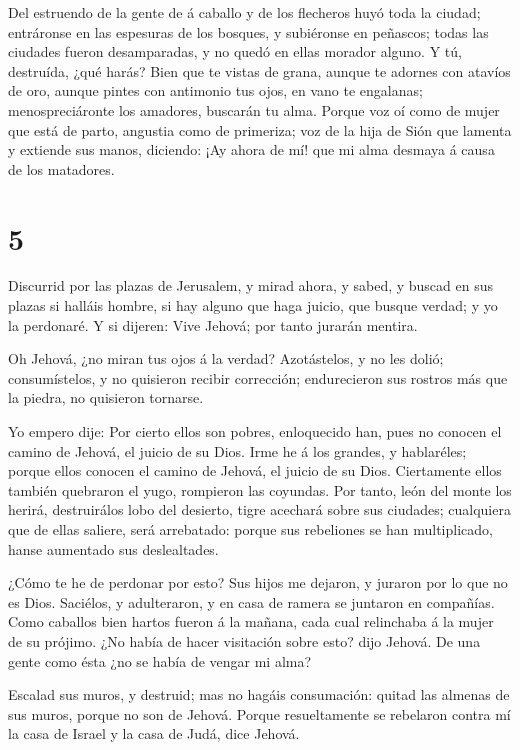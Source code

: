  Del estruendo de la gente de á caballo y de los flecheros
huyó toda la ciudad; entráronse en las espesuras de los bosques, y
subiéronse en peñascos; todas las ciudades fueron desamparadas, y no
quedó en ellas morador alguno.  Y tú, destruída, ¿qué
harás? Bien que te vistas de grana, aunque te adornes con atavíos de
oro, aunque pintes con antimonio tus ojos, en vano te engalanas;
menospreciáronte los amadores, buscarán tu alma.  Porque
voz oí como de mujer que está de parto, angustia como de primeriza; voz
de la hija de Sión que lamenta y extiende sus manos, diciendo: ¡Ay ahora
de mí! que mi alma desmaya á causa de los matadores.

\hypertarget{section-4}{%
\section{5}\label{section-4}}

 Discurrid por las plazas de Jerusalem, y mirad ahora, y
sabed, y buscad en sus plazas si halláis hombre, si hay alguno que haga
juicio, que busque verdad; y yo la perdonaré.  Y si dijeren:
Vive Jehová; por tanto jurarán mentira.

 Oh Jehová, ¿no miran tus ojos á la verdad? Azotástelos, y
no les dolió; consumístelos, y no quisieron recibir corrección;
endurecieron sus rostros más que la piedra, no quisieron tornarse.

 Yo empero dije: Por cierto ellos son pobres, enloquecido
han, pues no conocen el camino de Jehová, el juicio de su Dios.
 Irme he á los grandes, y hablaréles; porque ellos conocen
el camino de Jehová, el juicio de su Dios. Ciertamente ellos también
quebraron el yugo, rompieron las coyundas.  Por tanto, león
del monte los herirá, destruirálos lobo del desierto, tigre acechará
sobre sus ciudades; cualquiera que de ellas saliere, será arrebatado:
porque sus rebeliones se han multiplicado, hanse aumentado sus
deslealtades.

 ¿Cómo te he de perdonar por esto? Sus hijos me dejaron, y
juraron por lo que no es Dios. Saciélos, y adulteraron, y en casa de
ramera se juntaron en compañías.  Como caballos bien hartos
fueron á la mañana, cada cual relinchaba á la mujer de su prójimo.
 ¿No había de hacer visitación sobre esto? dijo Jehová. De
una gente como ésta ¿no se había de vengar mi alma?

 Escalad sus muros, y destruid; mas no hagáis consumación:
quitad las almenas de sus muros, porque no son de Jehová. 
Porque resueltamente se rebelaron contra mí la casa de Israel y la casa
de Judá, dice Jehová.

